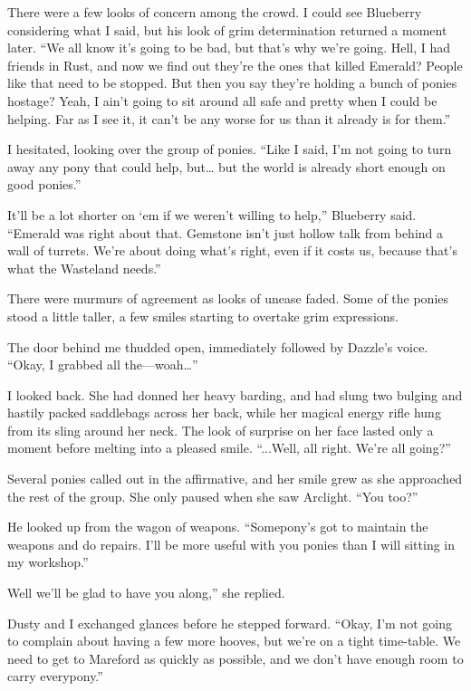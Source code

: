 There were a few looks of concern among the crowd. I could see Blueberry considering what I said, but his look of grim determination returned a moment later. “We all know it’s going to be bad, but that’s why we’re going. Hell, I had friends in Rust, and now we find out they’re the ones that killed Emerald? People like that need to be stopped. But then you say they’re holding a bunch of ponies hostage? Yeah, I ain’t going to sit around all safe and pretty when I could be helping. Far as I see it, it can’t be any worse for us than it already is for them.”

I hesitated, looking over the group of ponies. “Like I said, I’m not going to turn away any pony that could help, but… but the world is already short enough on good ponies.”

\leavevmode{}It’ll be a lot shorter on ‘em if we weren’t willing to help,” Blueberry said. “Emerald was right about that. Gemstone isn’t just hollow talk from behind a wall of turrets. We’re about doing what’s right, even if it costs us, because that’s what the Wasteland needs.”

There were murmurs of agreement as looks of unease faded. Some of the ponies stood a little taller, a few smiles starting to overtake grim expressions.

The door behind me thudded open, immediately followed by Dazzle’s voice. “Okay, I grabbed all the—woah…”

I looked back. She had donned her heavy barding, and had slung two bulging and hastily packed saddlebags across her back, while her magical energy rifle hung from its sling around her neck. The look of surprise on her face lasted only a moment before melting into a pleased smile. “...Well, all right. We’re all going?”

Several ponies called out in the affirmative, and her smile grew as she approached the rest of the group. She only paused when she saw Arclight. “You too?”

He looked up from the wagon of weapons. “Somepony’s got to maintain the weapons and do repairs. I’ll be more useful with you ponies than I will sitting in my workshop.”

\leavevmode{}Well we’ll be glad to have you along,” she replied.

Dusty and I exchanged glances before he stepped forward. “Okay, I’m not going to complain about having a few more hooves, but we’re on a tight time-table. We need to get to Mareford as quickly as possible, and we don’t have enough room to carry everypony.”

